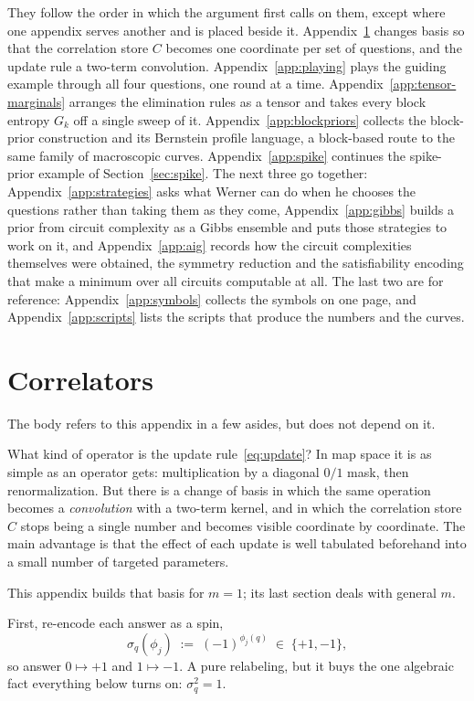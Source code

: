 \documentclass[11pt]{article}
\let\stdsection\section
\renewcommand{\section}{\clearpage\stdsection}
\begin{document}
They follow the order in which the argument first calls on them, except
where one appendix serves another and is placed beside it.
Appendix~\ref{app:correlators} changes basis so that the correlation
store $C$ becomes one coordinate per set of questions, and the update
rule a two-term convolution. Appendix~\ref{app:playing} plays the
guiding example through all four questions, one round at a time.
Appendix~\ref{app:tensor-marginals} arranges the elimination rules as a
tensor and takes every block entropy $G_k$ off a single sweep of it.
Appendix~\ref{app:blockpriors} collects the block-prior construction and
its Bernstein profile language, a block-based route to the same family of
macroscopic curves. Appendix~\ref{app:spike} continues the spike-prior
example of Section~\ref{sec:spike}. The next three go together:
Appendix~\ref{app:strategies} asks what Werner can do when he chooses the
questions rather than taking them as they come,
Appendix~\ref{app:gibbs} builds a prior from circuit complexity as a Gibbs
ensemble and puts those strategies to work on it, and
Appendix~\ref{app:aig} records how the circuit complexities themselves were
obtained, the symmetry reduction and the satisfiability encoding that make
a minimum over all circuits computable at all. The last two are for reference:
Appendix~\ref{app:symbols} collects the symbols on one page,
and Appendix~\ref{app:scripts} lists the scripts that produce the numbers
and the curves.

\section{Correlators}\label{app:correlators}

The body refers to this appendix in a few asides, but does not
depend on it.

What kind of operator is the update rule~\eqref{eq:update}? In map
space it is as simple as an operator gets: multiplication by a
diagonal $0/1$ mask, then renormalization. But there is a change of
basis in which the same operation becomes a \emph{convolution} with a
two-term kernel, and in which the correlation store $C$ stops being a
single number and becomes visible coordinate by coordinate. The main advantage is 
that the effect of each update is well tabulated beforehand into a small number of targeted parameters.

This
appendix builds that basis for $m = 1$; its last section deals
with general $m$.

First, re-encode each answer as a spin,
\begin{equation}\label{eq:spin}
  \sigma_q(\phi_j) \;:=\; (-1)^{\phi_j(q)} \;\in\; \{+1, -1\},
\end{equation}
so answer $0 \mapsto +1$ and $1 \mapsto -1$. A pure relabeling, but
it buys the one algebraic fact everything below turns on:
$\sigma_q^2 = 1$.
\end{document}
